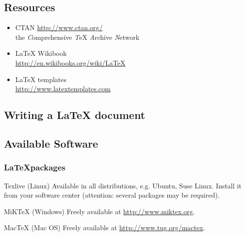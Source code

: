\subsection{Resources}
\begin{frame}

	\begin{itemize}
		\item CTAN \url{http://www.ctan.org/}\\
			the \emph{C}omprehensive \emph{T}eX \emph{A}rchive \emph{N}etwork
		\item LaTeX Wikibook\\
			\url{http://en.wikibooks.org/wiki/LaTeX}

		\item \LaTeX{} templates\\
			\url{http://www.latextemplates.com}
	\end{itemize}
\end{frame}


\subsection{Writing a \LaTeX{} document}
\begin{frame}
\begin{center}
\end{center}
\end{frame}


\subsection{Available Software}
\begin{frame}
	\frametitle{\LaTeX packages}

	\begin{block}{Texlive (Linux)}
		Available in all distributions, e.g. Ubuntu, Suse Linux. Install it
		from your software center (attention: several packages may be
		required).
	\end{block}
	\begin{block}{MiKTeX (Windows)}
		Freely available at \url{http://www.miktex.org}.
	\end{block}	
	\begin{block}{MacTeX (Mac OS)}
		Freely available at \url{http://www.tug.org/mactex}.
	\end{block}
\end{frame}

